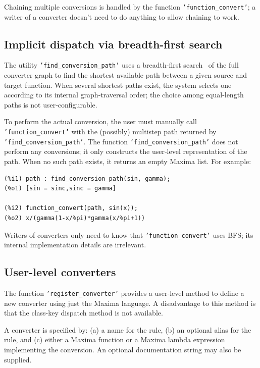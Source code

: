 \documentclass[12pt,fleqn]{extarticle}
\newcommand{\ttq}[1]{\texttt{'#1'}}
\newcommand{\funconvert}{\ttq{function\_convert}{ }}
\newenvironment{maximabox}
  {\begin{tcolorbox}[
      breakable,
      enhanced,
      colback=white,
      colframe=black!8,
      boxrule=0pt,
      borderline west={2.2pt}{0pt}{black!25},
      arc=1pt,
      left=11pt,
      right=7pt,
      top=9pt,
      bottom=9pt,
      before skip=14pt,
      after skip=14pt
    ]}
  {\end{tcolorbox}}
\begin{document}
Chaining multiple conversions is handled by the function \ttq{function\_convert}; a writer of
a converter doesn't need to do anything to allow chaining to work. 

\subsection{Implicit dispatch via breadth-first search}

The utility \ttq{find\_conversion\_path} uses a breadth-first search~\cite{clrs} of the full converter graph to 
find the shortest available path between a given source and target function. When several shortest paths exist, 
the system selects one according to its internal graph‑traversal order; the choice among equal‑length paths 
is not user‑configurable.

To perform the actual conversion, the user must manually call \ttq{function\_convert} with the (possibly) 
multistep path returned by \ttq{find\_conversion\_path}. The function \ttq{find\_conversion\_path} does 
not perform any conversions; it only constructs the user‑level representation of the path.
When no such path exists, it returns an empty Maxima list. For example:
\begin{maximabox}
\begin{verbatim}
(%i1) path : find_conversion_path(sin, gamma);
(%o1) [sin = sinc,sinc = gamma]

(%i2) function_convert(path, sin(x));
(%o2) x/(gamma(1-x/%pi)*gamma(x/%pi+1))
\end{verbatim}
\end{maximabox}
\noindent Writers of converters only need to know that \funconvert uses BFS; its internal implementation
details are irrelevant.
\noindent 

\subsection{User-level converters}
\label{sec:register-converter}

The function \ttq{register\_converter} provides a user-level method to define a new converter using just the Maxima language.  A disadvantage to this method is that the class-key dispatch method is 
not available. 

A converter is specified by: (a) a name for the rule,  (b) an optional alias for the rule, and (c) either
a Maxima function or a Maxima lambda expression implementing the conversion.  An optional documentation string may also be supplied.
\end{document}
